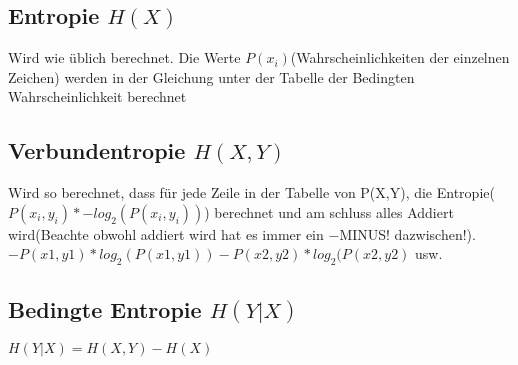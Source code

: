 \subsection{Entropie $H(X)$}
Wird wie üblich berechnet. Die Werte $P(x_i)$(Wahrscheinlichkeiten der einzelnen Zeichen) werden in der Gleichung unter der Tabelle der Bedingten Wahrscheinlichkeit berechnet
\subsection{Verbundentropie $H(X,Y)$}
Wird so berechnet, dass für jede Zeile in der Tabelle von P(X,Y), die Entropie(\colorbox{lightlightgrey}{$P(x_i,y_i)*-log_2(P(x_i, y_i))$}) berechnet und am schluss alles Addiert wird(Beachte obwohl addiert wird hat es immer ein $-$MINUS! dazwischen!).\\
\colorbox{lightlightgrey}{$-P(x1,y1) * log_2(P(x1,y1)) - P(x2,y2) * log_2(P(x2,y2)$ usw.}
\subsection{Bedingte Entropie $H(Y|X)$}
\colorbox{lightlightgrey}{$H(Y|X) = H(X,Y) - H(X)$}

